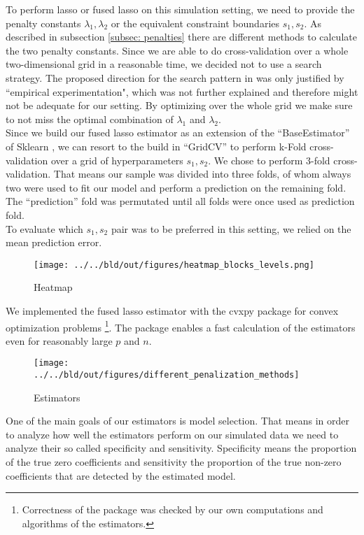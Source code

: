 \documentclass{article}
\theoremstyle{definition}
\begin{document}
To perform lasso or fused lasso on this simulation setting, we need to provide the penalty constants $\lambda_1,\lambda_2$ or the equivalent constraint boundaries $s_1, s_2$. As described in subsection \ref{subsec: penalties} there are different methods to calculate the two penalty constants. Since we are able to do cross-validation over a whole two-dimensional grid in a reasonable time, we decided not to use a search strategy. The proposed direction for the search pattern in \citet{fused} was only justified by “empirical experimentation", which was not further explained and therefore might not be adequate for our setting. By optimizing over the whole grid we make sure to not miss the optimal combination of $\lambda_1$ and $\lambda_2$.\\

Since we build our fused lasso estimator as an extension of the ``BaseEstimator'' of Sklearn \citep{scikit-learn}, we can resort to the build in ``GridCV'' to perform k-Fold cross-validation over a grid of hyperparameters $s_1,s_2$. We chose to perform 3-fold cross-validation. That means our sample was divided into three folds, of whom always two were used to fit our model and perform a prediction on the remaining fold. The ``prediction'' fold was permutated until all folds were once used as prediction fold.\\
To evaluate which $s_1,s_2$ pair was to be preferred in this setting, we relied on the mean prediction error.\\

\begin{figure}
	\texttt{[image: ../../bld/out/figures/heatmap\_blocks\_levels.png]}
	\caption{Heatmap}
\end{figure}

We implemented the fused lasso estimator with the cvxpy package for convex optimization problems \citep{cvxpy}\footnote{Correctness of the package was checked by our own computations and algorithms of the estimators.}. The package enables a fast calculation of the estimators even for reasonably large $p$ and $n$. \\

\begin{figure}
		\texttt{[image: ../../bld/out/figures/different\_penalization\_methods]}
		\caption{Estimators}
\end{figure}
One of the main goals of our estimators is model selection. That means in order to analyze how well the estimators perform on our simulated data we need to analyze their so called specificity and sensitivity. Specificity means the proportion of the true zero coefficients and sensitivity the proportion of the true non-zero coefficients that are detected by the estimated model.
\end{document}
